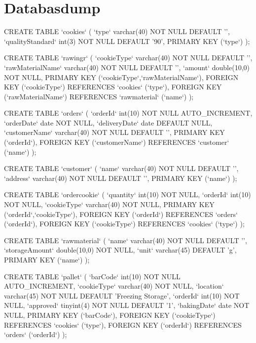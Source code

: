 \section{Databasdump}
CREATE TABLE `cookies` (
  `type` varchar(40) NOT NULL DEFAULT '',
  `qualityStandard` int(3) NOT NULL DEFAULT '90',
  PRIMARY KEY (`type`)
);

CREATE TABLE `rawingr` (
  `cookieType` varchar(40) NOT NULL DEFAULT '',
  `rawMaterialName` varchar(40) NOT NULL DEFAULT '',
  `amount` double(10,0) NOT NULL,
  PRIMARY KEY (`cookieType`,`rawMaterialName`),
   FOREIGN KEY (`cookieType`) REFERENCES `cookies` (`type`),
  FOREIGN KEY (`rawMaterialName`) REFERENCES `rawmaterial` (`name`)
);

CREATE TABLE `orders` (
  `orderId` int(10) NOT NULL AUTO_INCREMENT,
  `orderDate` date NOT NULL,
  `deliveryDate` date DEFAULT NULL,
  `customerName` varchar(40) NOT NULL DEFAULT '',
  PRIMARY KEY (`orderId`),
  FOREIGN KEY (`customerName`) REFERENCES `customer` (`name`)
);

CREATE TABLE `customer` (
  `name` varchar(40) NOT NULL DEFAULT '',
  `address` varchar(40) NOT NULL DEFAULT '',
  PRIMARY KEY (`name`)
);

CREATE TABLE `ordercookie` (
  `quantity` int(10) NOT NULL,
  `orderId` int(10) NOT NULL,
  `cookieType` varchar(40) NOT NULL,
  PRIMARY KEY (`orderId`,`cookieType`),
  FOREIGN KEY (`orderId`) REFERENCES `orders` (`orderId`),
  FOREIGN KEY (`cookieType`) REFERENCES `cookies` (`type`)
);

CREATE TABLE `rawmaterial` (
  `name` varchar(40) NOT NULL DEFAULT '',
  `storageAmount` double(10,0) NOT NULL,
  `unit` varchar(45) DEFAULT 'g',
  PRIMARY KEY (`name`)
);

CREATE TABLE `pallet` (
  `barCode` int(10) NOT NULL AUTO_INCREMENT,
  `cookieType` varchar(40) NOT NULL,
  `location` varchar(45) NOT NULL DEFAULT 'Freezing Storage',
  `orderId` int(10) NOT NULL,
  `approved` tinyint(4) NOT NULL DEFAULT '1',
  `bakingDate` date NOT NULL,
  PRIMARY KEY (`barCode`),
  FOREIGN KEY (`cookieType`) REFERENCES `cookies` (`type`),
  FOREIGN KEY (`orderId`) REFERENCES `orders` (`orderId`)
);